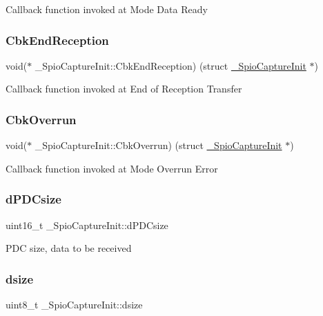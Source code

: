 Callback function invoked at Mode Data Ready \mbox{\label{struct__SpioCaptureInit_a964bb5183e0cc519ee1b9fd4b49d052b}} 
\subsubsection{\texorpdfstring{CbkEndReception}{CbkEndReception}}
{\footnotesize\ttfamily void($\ast$ \+\_\+\+Spio\+Capture\+Init\+::\+Cbk\+End\+Reception) (struct \mbox{\hyperlink{struct__SpioCaptureInit}{\+\_\+\+Spio\+Capture\+Init}} $\ast$)}

Callback function invoked at End of Reception Transfer \mbox{\label{struct__SpioCaptureInit_a544450416a7f46f05116d719168ad6db}} 
\subsubsection{\texorpdfstring{CbkOverrun}{CbkOverrun}}
{\footnotesize\ttfamily void($\ast$ \+\_\+\+Spio\+Capture\+Init\+::\+Cbk\+Overrun) (struct \mbox{\hyperlink{struct__SpioCaptureInit}{\+\_\+\+Spio\+Capture\+Init}} $\ast$)}

Callback function invoked at Mode Overrun Error \mbox{\label{struct__SpioCaptureInit_a1402f112a86ef3d729ba75a871c8e2c5}} 
\subsubsection{\texorpdfstring{dPDCsize}{dPDCsize}}
{\footnotesize\ttfamily uint16\+\_\+t \+\_\+\+Spio\+Capture\+Init\+::d\+P\+D\+Csize}

P\+DC size, data to be received \mbox{\label{struct__SpioCaptureInit_aa61d21b099a20dda3d273d2c3ef08c1c}} 
\subsubsection{\texorpdfstring{dsize}{dsize}}
{\footnotesize\ttfamily uint8\+\_\+t \+\_\+\+Spio\+Capture\+Init\+::dsize}

